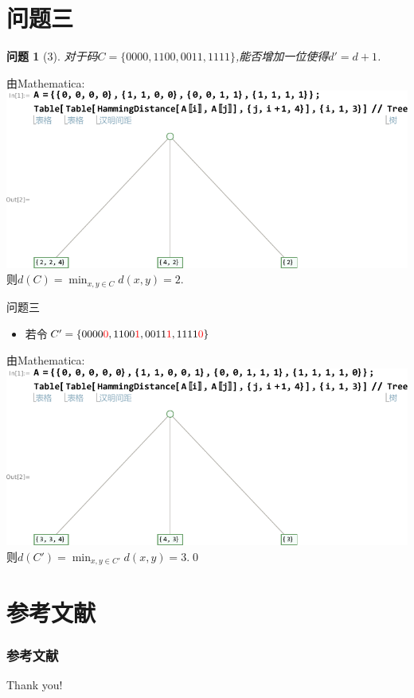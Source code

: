 \documentclass{beamer}
\newtheorem{question}{问题}
\begin{document}
	\section{问题三}
	\begin{frame}
	\begin{question}[3]
		\qquad 对于码$C=\{0000,1100,0011,1111\}$,能否增加一位使得$d'=d+1$.
	\end{question}
	由Mathematica:
	\noindent\includegraphics[width=\linewidth]{figure/q31.pdf}
	则$d(C)=\min_{x,y\in C}d(x,y)=2.$
	\end{frame}
	\begin{frame}{问题三}
		\begin{itemize}
			\item 若令$C'=\{0000\textcolor{red}{0},1100\textcolor{red}{1},0011\textcolor{red}{1},1111\textcolor{red}{0}\}$
		\end{itemize}
		由Mathematica:
		\noindent\includegraphics[width=\linewidth]{figure/q3.pdf}
		则$d(C')=\min_{x,y\in C'}d(x,y)=3.$\qed
	\end{frame}
\section{参考文献}
	\begin{frame}
		\frametitle{参考文献}
		
	\end{frame}
	\begin{frame}
		\centering\Huge \color{orange}Thank you!
	\end{frame}
	
\end{document}
